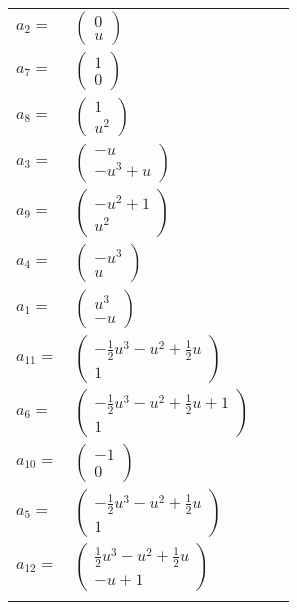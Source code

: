 \documentclass[1p]{elsarticle_modified}
\theoremstyle{definition}
\begin{document}
\begin{tabular}{m{7pt} m{180pt} m{7pt} m{180pt} }
\flushright $a_{2}=$&$\begin{pmatrix}0\\u\end{pmatrix}$ \\
\flushright $a_{7}=$&$\begin{pmatrix}1\\0\end{pmatrix}$ \\
\flushright $a_{8}=$&$\begin{pmatrix}1\\u^2\end{pmatrix}$ \\
\flushright $a_{3}=$&$\begin{pmatrix}- u\\- u^3+u\end{pmatrix}$ \\
\flushright $a_{9}=$&$\begin{pmatrix}- u^2+1\\u^2\end{pmatrix}$ \\
\flushright $a_{4}=$&$\begin{pmatrix}- u^3\\u\end{pmatrix}$ \\
\flushright $a_{1}=$&$\begin{pmatrix}u^3\\- u\end{pmatrix}$ \\
\flushright $a_{11}=$&$\begin{pmatrix}-\frac{1}{2} u^3- u^2+\frac{1}{2} u\\1\end{pmatrix}$ \\
\flushright $a_{6}=$&$\begin{pmatrix}-\frac{1}{2} u^3- u^2+\frac{1}{2} u+1\\1\end{pmatrix}$ \\
\flushright $a_{10}=$&$\begin{pmatrix}-1\\0\end{pmatrix}$ \\
\flushright $a_{5}=$&$\begin{pmatrix}-\frac{1}{2} u^3- u^2+\frac{1}{2} u\\1\end{pmatrix}$ \\
\flushright $a_{12}=$&$\begin{pmatrix}\frac{1}{2} u^3- u^2+\frac{1}{2} u\\- u+1\end{pmatrix}$\\&\end{tabular}
\end{document}
